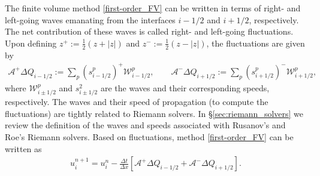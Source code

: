 \documentclass[preprint, 11pt]{article}
\newcommand{\W}{{\mathcal W}}
\newcommand{\A}{{\mathcal A}}
\begin{document}
The finite volume method \eqref{first-order_FV} can be written in terms of right- 
and left-going waves emanating from the interfaces $i-1/2$ and $i+1/2$, respectively. 
The net contribution of these waves is called right- and left-going fluctuations. 
Upon defining $z^+:=\frac{1}{2}(z+|z|)$ and $z^-:=\frac{1}{2}(z-|z|)$, 
the fluctuations are given by
\begin{align}\label{fluct}
  \A^+\Delta Q_{i-1/2} := \sum_p\left(s_{i-1/2}^p\right)^+\W_{i-1/2}^p, \qquad
  \A^-\Delta Q_{i+1/2} := \sum_p\left(s_{i+1/2}^p\right)^-\W_{i+1/2}^p,
\end{align}
where $\W_{i\pm 1/2}^p$ and $s_{i\pm 1/2}^2$ are the waves and their corresponding speeds, respectively. 
The waves and their speed of propagation (to compute the fluctuations) are tightly related to Riemann solvers. 
In \S\ref{sec:riemann_solvers} we review the definition of the waves and speeds associated with 
Rusanov's and Roe's Riemann solvers.
Based on fluctuations, method \eqref{first-order_FV} can be written as 
\begin{align}\label{first-order_via_fluct}
  u_i^{n+1}=u_i^n-\frac{\Delta t}{\Delta x}\left[\A^+\Delta Q_{i-1/2}+\A^-\Delta Q_{i+1/2}\right].
\end{align}
\end{document}
